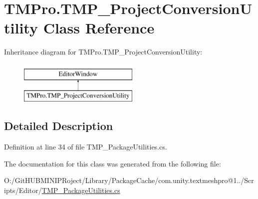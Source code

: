 \hypertarget{class_t_m_pro_1_1_t_m_p___project_conversion_utility}{}\section{T\+M\+Pro.\+T\+M\+P\+\_\+\+Project\+Conversion\+Utility Class Reference}
\label{class_t_m_pro_1_1_t_m_p___project_conversion_utility}
Inheritance diagram for T\+M\+Pro.\+T\+M\+P\+\_\+\+Project\+Conversion\+Utility\+:\begin{figure}[H]
\begin{center}
\leavevmode
\includegraphics[height=2.000000cm]{class_t_m_pro_1_1_t_m_p___project_conversion_utility}
\end{center}
\end{figure}


\subsection{Detailed Description}


Definition at line 34 of file T\+M\+P\+\_\+\+Package\+Utilities.\+cs.



The documentation for this class was generated from the following file\+:\begin{DoxyCompactItemize}
\item 
O\+:/\+Git\+H\+U\+B\+M\+I\+N\+I\+P\+Roject/\+Library/\+Package\+Cache/com.\+unity.\+textmeshpro@1../\+Scripts/\+Editor/\mbox{\hyperlink{_t_m_p___package_utilities_8cs}{T\+M\+P\+\_\+\+Package\+Utilities.\+cs}}\end{DoxyCompactItemize}
